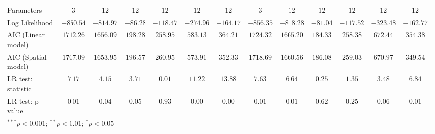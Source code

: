 \begin{table}
\begin{center}
\begin{tabular}{l c c c c c c c c c c c c}
Parameters                        & $3$           & $12$          & $12$          & $12$           & $12$          & $12$          & $3$           & $12$          & $12$          & $12$           & $12$          & $12$          \\
Log Likelihood                    & $-850.54$     & $-814.97$     & $-86.28$      & $-118.47$      & $-274.96$     & $-164.17$     & $-856.35$     & $-818.28$     & $-81.04$      & $-117.52$      & $-323.48$     & $-162.77$     \\
AIC (Linear model)                & $1712.26$     & $1656.09$     & $198.28$      & $258.95$       & $583.13$      & $364.21$      & $1724.32$     & $1665.20$     & $184.33$      & $258.38$       & $672.44$      & $354.38$      \\
AIC (Spatial model)               & $1707.09$     & $1653.95$     & $196.57$      & $260.95$       & $573.91$      & $352.33$      & $1718.69$     & $1660.56$     & $186.08$      & $259.03$       & $670.97$      & $349.54$      \\
LR test: statistic                & $7.17$        & $4.15$        & $3.71$        & $0.01$         & $11.22$       & $13.88$       & $7.63$        & $6.64$        & $0.25$        & $1.35$         & $3.48$        & $6.84$        \\
LR test: p-value                  & $0.01$        & $0.04$        & $0.05$        & $0.93$         & $0.00$        & $0.00$        & $0.01$        & $0.01$        & $0.62$        & $0.25$         & $0.06$        & $0.01$        \\
\hline
\multicolumn{13}{l}{\scriptsize{$^{***}p<0.001$; $^{**}p<0.01$; $^{*}p<0.05$}}
\end{tabular}
\label{Tab:SCSAR_Estimates_G4_Phi025}
\end{center}
\end{table}
